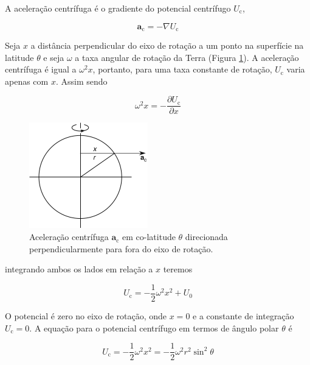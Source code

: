 \documentclass[]{book}
\theoremstyle{definition}
\theoremstyle{definition}
\theoremstyle{definition}
\theoremstyle{remark}
\begin{document}
A aceleração centrífuga é o gradiente do potencial centrífugo \(U_\mathrm{c}\),

\begin{equation*}
\mathbf{a}_{\mathrm{c}}=-\nabla U_{\mathrm{c}}
\end{equation*}

Seja \(x\) a distância perpendicular do eixo de rotação a um ponto na superfície na latitude \(\theta\) e seja \(\omega\) a taxa angular de rotação da Terra (Figura \ref{fig:centrifugo}). A aceleração centrífuga é igual a \(\omega^2 x\), portanto, para uma taxa constante de rotação, \(U_\mathrm{c}\) varia apenas com \(x\). Assim sendo

\begin{equation*}
\omega^{2} x=-\frac{\partial U_{\mathrm{c}}}{\partial x}
\end{equation*}

\begin{figure}

{\centering \includegraphics[width=0.4\linewidth]{fig/Fig_02.23} 

}

\caption{Aceleração centrífuga $\mathbf{a}_\mathrm{c}$ em co-latitude $\theta$ direcionada perpendicularmente para fora do eixo de rotação.}\label{fig:centrifugo}
\end{figure}

integrando ambos os lados em relação a \(x\) teremos

\begin{equation*}
U_{\mathrm{c}}=-\frac{1}{2} \omega^{2} x^{2}+U_{0}
\end{equation*}

O potencial é zero no eixo de rotação, onde \(x = 0\) e a constante de integração \(U_\mathrm{c} = 0\). A equação para o potencial centrífugo em termos de ângulo polar \(\theta\) é

\begin{equation*}
U_{\mathrm{c}}=-\frac{1}{2} \omega^{2} x^{2}=-\frac{1}{2} \omega^{2} r^{2} \sin ^{2} \theta
\end{equation*}
\end{document}
